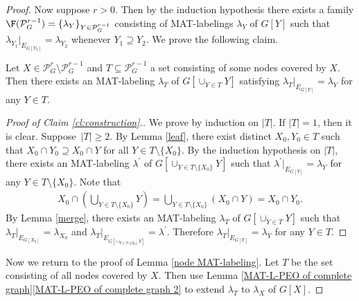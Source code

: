 \begin{proof}
Now suppose $ r > 0 $.
Then by the induction hypothesis there exists a family $\F( \mathcal{P}_{G}^{r-1})= \{\lambda_{Y}\}_{Y \in \mathcal{P}_{G}^{r-1}} $ consisting of MAT-labelings $ \lambda_{Y} $ of $ G[Y] $ such that $ \lambda_{Y_{1}}|_{E_{G[Y_{2}]}} = \lambda_{Y_{2}} $ whenever $ Y_{1} \supseteq Y_{2} $. 
We prove the following claim.
\begin{claim} 
\label{cl:construction} 
 Let $ X \in \mathcal{P}_{G}^{r} \setminus \mathcal{P}_{G}^{r-1} $ and $ T \subseteq \mathcal{P}_{G}^{r-1} $ a set consisting of some nodes covered by $ X $. 
Then there exists an MAT-labeling $ \lambda_{T} $ of $ G[\cup_{Y \in T}Y] $ satisfying $ \lambda_{T}|_{E_{G[Y]}} = \lambda_{Y} $ for any $ Y \in T $.  
\end{claim}
\begin{proof}[Proof of Claim \ref{cl:construction}.]
We prove by induction on $ |T| $.
If $ |T| = 1 $, then it is clear. 
Suppose~$ |T| \geq 2 $. 
By Lemma \ref{leaf}, there exist distinct $ X_{0}, Y_{0} \in T $ such that $ X_{0} \cap Y_{0} \supseteq X_{0} \cap Y $ for all $ Y \in T \setminus \{X_{0}\} $. 
By the induction hypothesis on $ |T| $, there exists an MAT-labeling $ \lambda^{\prime} $ of $ G[\cup_{Y \in T\setminus\{X_{0}\}}Y] $ such that $ \lambda^{\prime}|_{E_{G[Y]}} = \lambda_{Y} $ for any $ Y \in T\setminus\{X_{0}\} $. 
Note that
\begin{align*}
X_{0} \cap \left(\bigcup_{Y \in T \setminus\{X_{0}\}}Y\right)
= \bigcup_{Y \in T \setminus\{X_{0}\}}(X_{0} \cap Y) = X_{0} \cap Y_{0}.
\end{align*}
By Lemma \ref{merge}, there exists an MAT-labeling $ \lambda_{T} $ of $ G[\cup_{Y \in T}Y] $ such that $ \lambda_{T}|_{E_{G[X_{0}]}} = \lambda_{X_{0}} $ and $ \lambda_{T}|_{E_{G[\cup_{Y \in T\setminus\{X_{0}\}}Y]}} = \lambda^{\prime} $. 
Therefore $ \lambda_{T}|_{E_{G[Y]}} = \lambda_{Y} $ for any $ Y \in T $. 
\end{proof}
Now we return to the proof of Lemma \ref{node MAT-labeling}. 
Let $ T $ be the set consisting of all nodes covered by $ X $. 
Then use Lemma \ref{MAT-L-PEO of complete graph}\ref{MAT-L-PEO of complete graph 2} to extend $ \lambda_{T} $ to $ \lambda_{X} $ of $ G[X] $. 
\end{proof}

